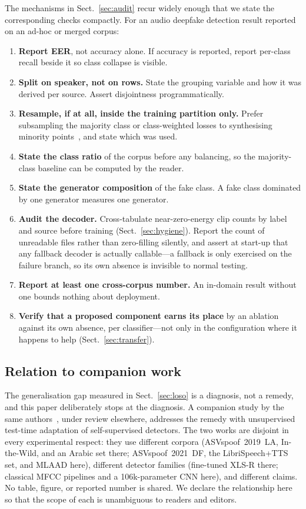 \documentclass[sn-mathphys-num,pdflatex]{sn-jnl}
\begin{document}
The mechanisms in Sect.~\ref{sec:audit} recur widely enough that we state the
corresponding checks compactly. For an audio deepfake detection result reported
on an ad-hoc or merged corpus:

\begin{enumerate}
\item \textbf{Report EER}, not accuracy alone. If accuracy is reported, report
per-class recall beside it so class collapse is visible.
\item \textbf{Split on speaker, not on rows.} State the grouping variable and how
it was derived per source. Assert disjointness programmatically.
\item \textbf{Resample, if at all, inside the training partition only.} Prefer
subsampling the majority class or class-weighted losses to synthesising minority
points~\cite{smote}, and state which was used.
\item \textbf{State the class ratio} of the corpus before any balancing, so the
majority-class baseline can be computed by the reader.
\item \textbf{State the generator composition} of the fake class. A fake class
dominated by one generator measures one generator.
\item \textbf{Audit the decoder.} Cross-tabulate near-zero-energy clip counts by
label and source before training (Sect.~\ref{sec:hygiene}). Report the count of
unreadable files rather than zero-filling silently, and assert at start-up that
any fallback decoder is actually callable---a fallback is only exercised on the
failure branch, so its own absence is invisible to normal testing.
\item \textbf{Report at least one cross-corpus number.} An in-domain result
without one bounds nothing about deployment.
\item \textbf{Verify that a proposed component earns its place} by an ablation
against its own absence, per classifier---not only in the configuration where it
happens to help (Sect.~\ref{sec:transfer}).
\end{enumerate}

\subsection{Relation to companion work}\label{sec:companion}

The generalisation gap measured in Sect.~\ref{sec:loso} is a diagnosis, not a
remedy, and this paper deliberately stops at the diagnosis. A companion study by
the same authors~\cite{companion}, under review elsewhere, addresses the remedy
with unsupervised test-time adaptation of self-supervised detectors. The two
works are disjoint in every experimental respect: they use different corpora
(ASVspoof~2019~LA, In-the-Wild, and an Arabic set there; ASVspoof~2021~DF, the
Libri\-Speech+TTS set, and MLAAD here), different detector families
(fine-tuned XLS-R there; classical MFCC pipelines and a 106k-parameter CNN
here), and different claims. No table, figure, or reported number is shared. We
declare the relationship here so that the scope of each is unambiguous to
readers and editors.
\end{document}
